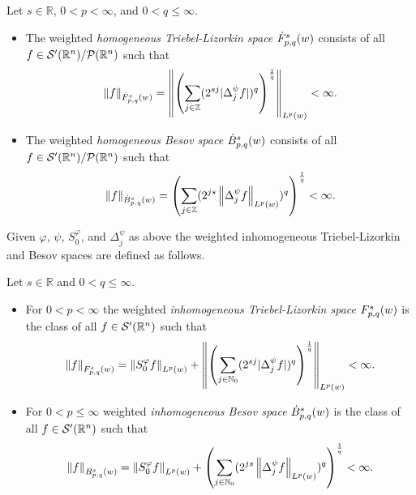 {\begin{dfn}\label{TL_B_def}
Let $s\in\mathbb{R}$, $0<p<\infty$, and $0<q\leq\infty$.
\begin{itemize}
\item The weighted \textit{homogeneous Triebel-Lizorkin space} $\tlw{p}{s}{q}{w}$ consists of all $f\in \swp/\mathcal{P}(\rn)$ such that 
\begin{equation*}
\norm{f}{\tlw{p}{s}{q}{w}}=\norm{\left(\sum_{j\in\ent}(2^{sj}|\Delta^\psi_jf|)^q\right)^{\frac{1}{q}}}{\lebw{p}{w}}<\infty.
\end{equation*}
\item The weighted \textit{homogeneous Besov space} $\besw{p}{s}{q}{w}$ consists of all $f\in \swp/\mathcal{P}(\rn)$ such that 
\begin{equation}
\norm{f}{\besw{p}{s}{q}{w}} = \left(\sum_{j\in\ent} (2^{js}\norm{\Delta^\psi_jf}{L^p(w)})^q\right)^{\frac{1}{q}} < \infty.
\end{equation}
\end{itemize}
\end{dfn}

Given $\varphi$, $\psi$, $S^\varphi_0$, and $\Delta^\psi_j$ as above the weighted inhomogeneous Triebel-Lizorkin and Besov spaces are defined as follows. 

\begin{dfn}\label{ITL_B_def}
Let $s\in\mathbb{R}$ and $0<q\leq\infty$.
\begin{itemize}
\item For $0<p<\infty$ the weighted \textit{inhomogeneous Triebel-Lizorkin space} $\itlw{p}{s}{q}{w}$ is the class of all $f\in\mathcal{S}'(\rn)$ such that
\begin{equation*}
\norm{f}{\itlw{p}{s}{q}{w}}= \norm{S^\varphi_0 f}{L^p(w)} + \norm{\left(\sum_{j\in\naz}(2^{sj}|\Delta^\psi_jf|)^q\right)^{\frac{1}{q}}}{\lebw{p}{w}}<\infty.
\end{equation*}
\item For $0<p\leq\infty$ weighted \textit{inhomogeneous Besov space} $\besw{p}{s}{q}{w}$ is the class of all $f\in\mathcal{S}'(\rn)$ such that 
\begin{equation*}
\norm{f}{\ibesw{p}{s}{q}{w}} = \norm{S^\varphi_0 f}{L^p(w)} + \left(\sum_{j\in\naz} (2^{js}\norm{\Delta^\psi_jf}{L^p(w)})^q\right)^{\frac{1}{q}} < \infty.
\end{equation*}
\end{itemize}
\end{dfn}

}

